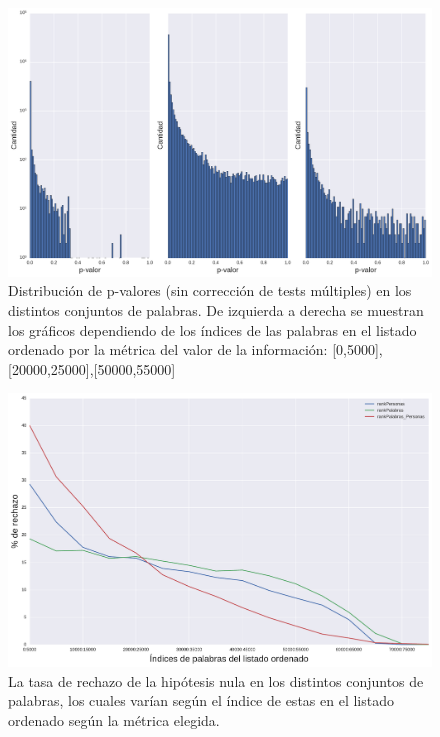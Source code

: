 \begin{figure}[!ht]\centering
  
    \includegraphics[width=0.95\linewidth]{./images/pvalores_sinBonferroni.pdf}
    \caption{Distribución de p-valores (sin corrección de tests múltiples) en los distintos conjuntos de palabras. De izquierda a derecha se muestran los gráficos dependiendo de los índices de las palabras en el listado ordenado por la métrica del valor de la información: [0,5000], [20000,25000],[50000,55000]} 
    \label{fig:pvalores_sinBonferroni} 

\end{figure}

\begin{figure}[!ht]\centering
  
    \includegraphics[width=0.95\linewidth]{./images/rechazo_metricas.pdf}
    \caption{La tasa de rechazo de la hipótesis nula en los distintos conjuntos de palabras, los cuales varían según el índice de estas en el listado ordenado según la métrica elegida.} 
    \label{fig:rechazo_metricas} 

\end{figure}
